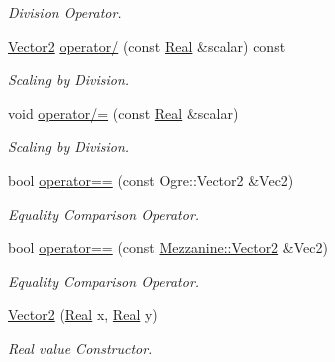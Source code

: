 \begin{DoxyCompactItemize}
\begin{DoxyCompactList}\small\item\em Division Operator. \item\end{DoxyCompactList}\item 
\hyperlink{classMezzanine_1_1Vector2}{Vector2} \hyperlink{classMezzanine_1_1Vector2_a76d2db9e91db1662612ccf122a4b55bd}{operator/} (const \hyperlink{namespaceMezzanine_a726731b1a7df72bf3583e4a97282c6f6}{Real} \&scalar) const 
\begin{DoxyCompactList}\small\item\em Scaling by Division. \item\end{DoxyCompactList}\item 
void \hyperlink{classMezzanine_1_1Vector2_ad42b7cd3efd647cdbf4b299ab2dc39f2}{operator/=} (const \hyperlink{namespaceMezzanine_a726731b1a7df72bf3583e4a97282c6f6}{Real} \&scalar)
\begin{DoxyCompactList}\small\item\em Scaling by Division. \item\end{DoxyCompactList}\item 
bool \hyperlink{classMezzanine_1_1Vector2_a790134b37da0df462c66c0013f25c681}{operator==} (const Ogre::Vector2 \&Vec2)
\begin{DoxyCompactList}\small\item\em Equality Comparison Operator. \item\end{DoxyCompactList}\item 
bool \hyperlink{classMezzanine_1_1Vector2_a62ea76da87eee960f8bd373a6243e9a2}{operator==} (const \hyperlink{classMezzanine_1_1Vector2}{Mezzanine::Vector2} \&Vec2)
\begin{DoxyCompactList}\small\item\em Equality Comparison Operator. \item\end{DoxyCompactList}\item 
\hyperlink{classMezzanine_1_1Vector2_a3abcc1fd9f74456cd8f8441d790d03ce}{Vector2} (\hyperlink{namespaceMezzanine_a726731b1a7df72bf3583e4a97282c6f6}{Real} x, \hyperlink{namespaceMezzanine_a726731b1a7df72bf3583e4a97282c6f6}{Real} y)
\begin{DoxyCompactList}\small\item\em Real value Constructor. \item\end{DoxyCompactList}\item 

\end{DoxyCompactItemize}
